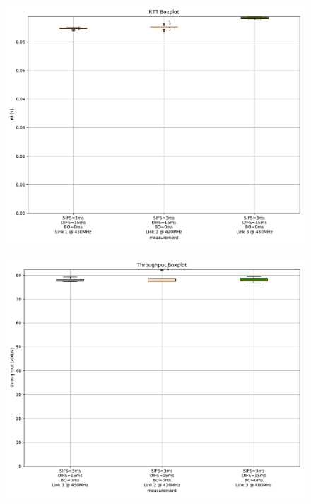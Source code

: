 \documentclass{article}
\begin{document}
\begin{figure}
	\includegraphics[width=\textwidth]{no_bo_single/boxplot/rtt_boxplot}
\end{figure}

\begin{figure}
	\includegraphics[width=\textwidth]{no_bo_single/boxplot/throughput_boxplot}
\end{figure}

\end{document}
